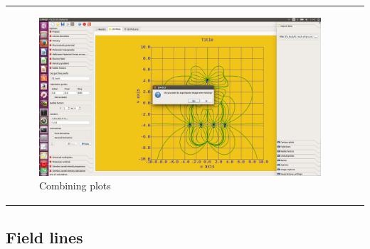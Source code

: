 \documentclass[10pt]{article}
\begin{document}
\begin{tabular}{lr}
\begin{minipage}{.5\linewidth}
\vspace*{1mm}
\begin{figure}[H]
    \begin{center}
        \includegraphics[width=.8\linewidth]{damqt_fig_3_4.png}
    \end{center}
    \caption{Combining plots \label{fig:3_3b}}
\end{figure}

\end{minipage}
\end{tabular}

\subsection{Field lines \label{sec:3.2}}
\end{document}
